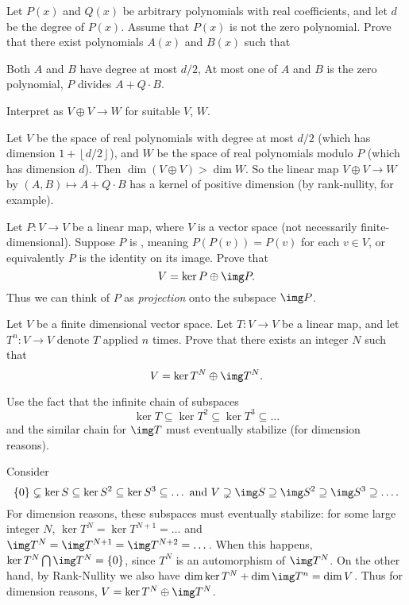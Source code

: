 \begin{problem}[TSTST 2014]
	\gim
	Let $P(x)$ and $Q(x)$ be arbitrary polynomials with real coefficients,
	and let $d$ be the degree of $P(x)$.
	Assume that $P(x)$ is not the zero polynomial.
	Prove that there exist polynomials $A(x)$ and $B(x)$ such that
	\begin{enumerate}[(i)]
		\ii Both $A$ and $B$ have degree at most $d/2$,
		\ii At most one of $A$ and $B$ is the zero polynomial,
		\ii $P$ divides $A+Q \cdot B$.
	\end{enumerate}
	\begin{hint}
		Interpret as $V \oplus V \to W$ for suitable $V$, $W$.
	\end{hint}
	\begin{sol}
		Let $V$ be the space of real polynomials with degree at most $d/2$
		(which has dimension $1 + \left\lfloor d/2 \right\rfloor$),
		and $W$ be the space of real polynomials modulo $P$ (which has dimension $d$).
		Then $\dim (V \oplus V) > \dim W$.
		So the linear map $V \oplus V \to W$ by $(A,B) \mapsto A + Q \cdot B$
		has a kernel of positive dimension
		(by rank-nullity, for example).
	\end{sol}
\end{problem}

\begin{sproblem}
	\label{prob:idempotent}
	Let $P \colon V \to V$ be a linear map,
	where $V$ is a vector space
	(not necessarily finite-dimensional).
	Suppose $P$ is ,
	meaning $P(P(v)) = P(v)$ for each $v \in V$,
	or equivalently $P$ is the identity on its image.
	Prove that \[ V = \ker P \oplus \img P. \]
	Thus we can think of $P$ as \emph{projection}
	onto the subspace $\img P$.
\end{sproblem}

\begin{sproblem}
	\label{prob:endomorphism_eventual_lemma}
	\gim
	Let $V$ be a finite dimensional vector space.
	Let $T \colon V \to V$ be a linear map,
	and let $T^n \colon V \to V$ denote $T$ applied $n$ times.
	Prove that there exists an integer $N$ such that
	\[ V = \ker T^N \oplus \img T^N. \]
	\begin{hint}
		Use the fact that the infinite chain of subspaces
		\[ \ker T \subseteq \ker T^2 \subseteq \ker T^3 \subseteq \dots \]
		and the similar chain for $\img T$ must eventually stabilize
		(for dimension reasons).
	\end{hint}
	\begin{sol}
		Consider
		\[
			\{0\} \subsetneq \ker S \subseteq \ker S^2 \subseteq \ker S^3 \subseteq \dots
			\text{  and  }
			V \supsetneq \img S \supseteq \img S^2 \supseteq \img S^3 \supseteq \dots.
		\]
		For dimension reasons, these subspaces must eventually stabilize:
		for some large integer $N$,
		$\ker T^N = \ker T^{N+1} = \dots$
		and $\img T^N = \img T^{N+1} = \img T^{N+2} = \dots$.
		When this happens, $\ker T^N \bigcap \img T^N = \{0\}$,
		since $T^N$ is an automorphism of $\img T^N$.
		On the other hand, by Rank-Nullity we also have
		$\dim \ker T^N + \dim \img T^n = \dim V$.
		Thus for dimension reasons, $V = \ker T^N \oplus \img T^N$.
	\end{sol}
\end{sproblem}

